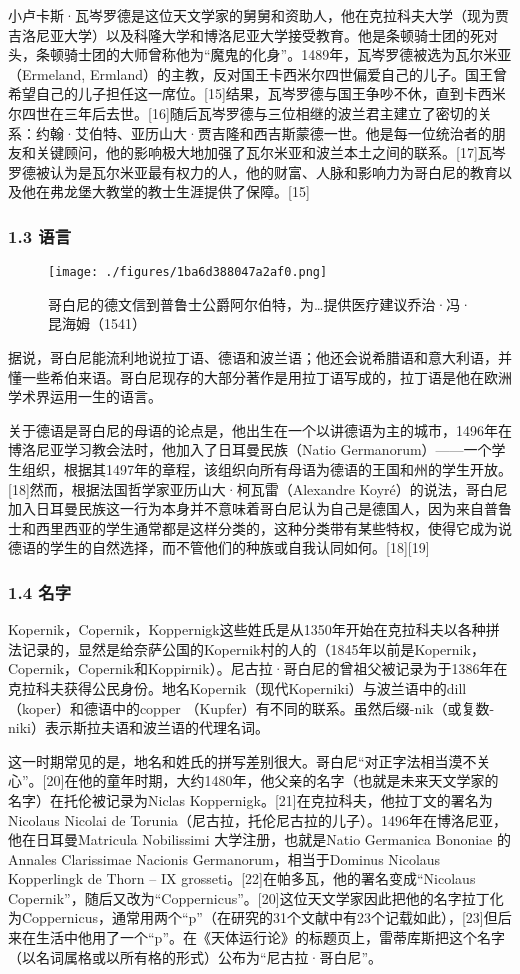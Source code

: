 小卢卡斯·瓦岑罗德是这位天文学家的舅舅和资助人，他在克拉科夫大学（现为贾吉洛尼亚大学）以及科隆大学和博洛尼亚大学接受教育。他是条顿骑士团的死对头，条顿骑士团的大师曾称他为“魔鬼的化身”。1489年，瓦岑罗德被选为瓦尔米亚（Ermeland, Ermland）的主教，反对国王卡西米尔四世偏爱自己的儿子。国王曾希望自己的儿子担任这一席位。[15]结果，瓦岑罗德与国王争吵不休，直到卡西米尔四世在三年后去世。[16]随后瓦岑罗德与三位相继的波兰君主建立了密切的关系：约翰·艾伯特、亚历山大·贾吉隆和西吉斯蒙德一世。他是每一位统治者的朋友和关键顾问，他的影响极大地加强了瓦尔米亚和波兰本土之间的联系。[17]瓦岑罗德被认为是瓦尔米亚最有权力的人，他的财富、人脉和影响力为哥白尼的教育以及他在弗龙堡大教堂的教士生涯提供了保障。[15]

\subsubsection{1.3 语言}
\begin{figure}[ht]
\centering
\texttt{[image: ./figures/1ba6d388047a2af0.png]}
\caption{哥白尼的德文信到普鲁士公爵阿尔伯特，为…提供医疗建议乔治·冯·昆海姆（1541）} \label{fig_GBN_3}
\end{figure}
据说，哥白尼能流利地说拉丁语、德语和波兰语；他还会说希腊语和意大利语，并懂一些希伯来语。哥白尼现存的大部分著作是用拉丁语写成的，拉丁语是他在欧洲学术界运用一生的语言。

关于德语是哥白尼的母语的论点是，他出生在一个以讲德语为主的城市，1496年在博洛尼亚学习教会法时，他加入了日耳曼民族（Natio Germanorum）——一个学生组织，根据其1497年的章程，该组织向所有母语为德语的王国和州的学生开放。[18]然而，根据法国哲学家亚历山大·柯瓦雷（Alexandre Koyré）的说法，哥白尼加入日耳曼民族这一行为本身并不意味着哥白尼认为自己是德国人，因为来自普鲁士和西里西亚的学生通常都是这样分类的，这种分类带有某些特权，使得它成为说德语的学生的自然选择，而不管他们的种族或自我认同如何。[18][19]

\subsubsection{1.4 名字}
Kopernik，Copernik，Koppernigk这些姓氏是从1350年开始在克拉科夫以各种拼法记录的，显然是给奈萨公国的Kopernik村的人的（1845年以前是Kopernik，Copernik，Copernik和Koppirnik）。尼古拉·哥白尼的曾祖父被记录为于1386年在克拉科夫获得公民身份。地名Kopernik（现代Koperniki）与波兰语中的dill （koper）和德语中的copper （Kupfer）有不同的联系。虽然后缀-nik（或复数-niki）表示斯拉夫语和波兰语的代理名词。

这一时期常见的是，地名和姓氏的拼写差别很大。哥白尼“对正字法相当漠不关心”。[20]在他的童年时期，大约1480年，他父亲的名字（也就是未来天文学家的名字）在托伦被记录为Niclas Koppernigk。[21]在克拉科夫，他拉丁文的署名为Nicolaus Nicolai de Torunia（尼古拉，托伦尼古拉的儿子）。1496年在博洛尼亚，他在日耳曼Matricula Nobilissimi 大学注册，也就是Natio Germanica Bononiae 的Annales Clarissimae Nacionis Germanorum，相当于Dominus Nicolaus Kopperlingk de Thorn – IX grosseti。[22]在帕多瓦，他的署名变成“Nicolaus Copernik”，随后又改为“Coppernicus”。[20]这位天文学家因此把他的名字拉丁化为Coppernicus，通常用两个“p”（在研究的31个文献中有23个记载如此），[23]但后来在生活中他用了一个“p”。在《天体运行论》的标题页上，雷蒂库斯把这个名字（以名词属格或以所有格的形式）公布为“尼古拉·哥白尼”。

